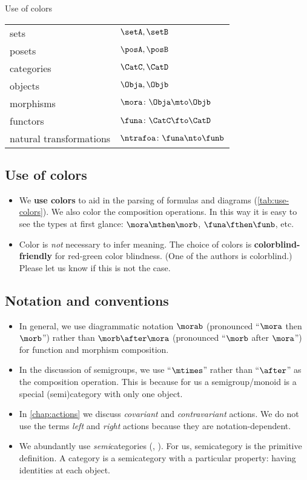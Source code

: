 \begin{margintable}
    \caption{Use of colors}
    \label{tab:use-colors}
    \begin{tabular}{p{2.5cm}l}
        sets                           & $\setA, \setB$ \\
        posets                         & $\posA, \posB$ \\
        categories                     & $\CatC, \CatD$ \\
        objects                        & $\Obja, \Objb$ \\
        morphisms                      & $\mora \colon \Obja \mto \Objb$ \\
        functors                       & $\funa \colon \CatC \fto \CatD$ \\
        natural \mbox{transformations} & $\ntrafoa \colon \funa \nto \funb$
    \end{tabular}
\end{margintable}
\subsection{Use of colors}
\begin{itemize}
    \item We \textbf{use colors} to aid in the parsing of formulas and diagrams (\cref{tab:use-colors}).
          We also color the composition operations.
          In this way it is easy to see the types at first glance:
          $\mora\mthen\morb$, $\funa\fthen\funb$, etc.
    \item Color is \emph{not} necessary to infer meaning.
          The choice of colors is \textbf{colorblind-friendly} for red-green color blindness.
          (One of the authors is colorblind.)
          Please let us know if this is not the case.
\end{itemize}

\subsection{Notation and conventions}
\begin{itemize}
    \item In general, we use diagrammatic notation $\morab$ (pronounced ``$\mora$ then $\morb$'') rather than $\morb \after \mora$ (pronounced ``$\morb$ after $\mora$'') for function and morphism composition.
    \item In the discussion of semigroups, we use ``$\mtimes$'' rather than ``$\after$'' as the  composition operation.
          This is because for us a semigroup/monoid is a special (semi)category with only one object.
    \item In \cref{chap:actions} we discuss \emph{covariant} and \emph{contravariant} actions.
          We do not use the terms \emph{left} and \emph{right} actions because they are notation-dependent.
    \item We abundantly use \emph{semi}categories (, \etc).
          For us, semicategory is the primitive definition.
          A category is a semicategory with a particular property: having identities at each object.
\end{itemize}

